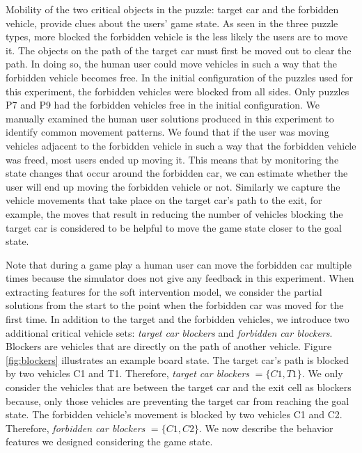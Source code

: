 \documentclass[doctor]{thesis} %
\theoremstyle{plain}
\begin{document}
Mobility of the two critical objects in the puzzle: target car and the forbidden vehicle, provide clues about the users' game state. As seen in the three puzzle types, more blocked the forbidden vehicle is the less likely the users are to move it. The objects on the path of the target car must first be moved out to clear the path. In doing so, the human user could move vehicles in such a way that the forbidden vehicle becomes free. In the initial configuration of the puzzles used for this experiment, the forbidden vehicles were blocked from all sides. Only puzzles P7 and P9 had the forbidden vehicles free in the initial configuration. We manually examined the human user solutions produced in this experiment to identify common movement patterns. We found that if the user was moving vehicles adjacent to the forbidden vehicle in such a way that the forbidden vehicle was freed, most users ended up moving it. This means that by monitoring the state changes that occur around the forbidden car, we can estimate whether the user will end up moving the forbidden vehicle or not. Similarly we capture the vehicle movements that take place on the target car's path to the exit, for example, the moves that result in reducing the number of vehicles blocking the target car is considered to be helpful to move the game state closer to the goal state.

Note that during a game play a human user can move the forbidden car multiple times because the simulator does not give any feedback in this experiment. When extracting features for the soft intervention model, we consider the partial solutions from the start to the point when the forbidden car was moved for the first time. In addition to the target and the forbidden vehicles, we introduce two additional critical vehicle sets: \textit{target car blockers} and \textit{forbidden car blockers}. Blockers are vehicles that are  directly on the path of another vehicle. Figure \ref{fig:blockers} illustrates an example board state. The target car's path is blocked by two vehicles C1 and T1. Therefore, \textit{target car blockers} $= \lbrace C1, T1\rbrace$. We only consider the vehicles that are between the target car and the exit cell as blockers because, only those vehicles are preventing the target car from reaching the goal state. The forbidden vehicle's movement is blocked by two vehicles C1 and C2. Therefore, \textit{forbidden car blockers} $=\lbrace C1, C2\rbrace$. We now describe the behavior features we designed considering the game state.
\end{document}
